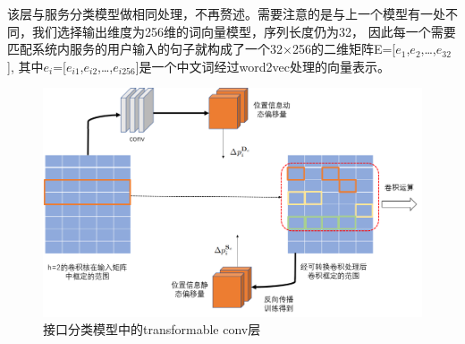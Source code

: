 该层与服务分类模型做相同处理，不再赘述。需要注意的是与上一个模型有一处不同，我们选择输出维度为256维的词向量模型，序列长度仍为32，
因此每一个需要匹配系统内服务的用户输入的句子就构成了一个32×256的二维矩阵E=[$e_{1}$,$e_{2}$,\dots,$e_{32}$],
其中$e_{i}$=[$e_{i1}$,$e_{i2}$,\dots,$e_{i256}$]是一个中文词经过word2vec处理的向量表示。

\begin{figure}[htbp]
  \centering
  \includegraphics[scale=0.5]{./images/tansconv.jpg}
  \caption{接口分类模型中的transformable conv层}
  \label{fig:tansconv}
\end{figure}

